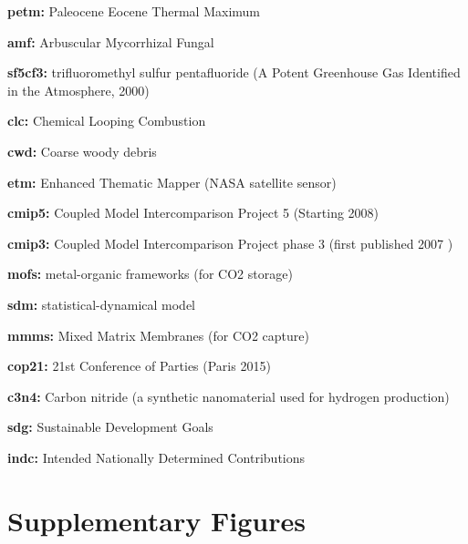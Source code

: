 \documentclass{article}
\begin{document}
\begin{linenumbers}
		\noindent\textbf{petm:} Paleocene Eocene Thermal Maximum
		
		\noindent\textbf{amf:}  Arbuscular Mycorrhizal Fungal
		
		\noindent\textbf{sf5cf3:} trifluoromethyl sulfur pentafluoride (A Potent Greenhouse Gas Identified in the Atmosphere, 2000)
		
		\noindent\textbf{clc:} Chemical Looping Combustion
		
		\noindent\textbf{cwd:} Coarse woody debris
		
		\noindent\textbf{etm:} Enhanced Thematic Mapper (NASA satellite sensor)
		
		\noindent\textbf{cmip5:} Coupled Model Intercomparison Project 5 (Starting 2008)
		
		\noindent\textbf{cmip3:} Coupled Model Intercomparison Project phase 3 (first published 2007 \cite{Meehl2007})
		
		\noindent\textbf{mofs:} metal-organic frameworks (for CO2 storage)
		
		\noindent\textbf{sdm:} statistical-dynamical model
		
		\noindent\textbf{mmms:} Mixed Matrix Membranes (for CO2 capture)
		
		\noindent\textbf{cop21:} 21st Conference of Parties (Paris 2015) 
		
		\noindent\textbf{c3n4:} Carbon nitride (a synthetic nanomaterial used for hydrogen production)
		
		\noindent\textbf{sdg:} Sustainable Development Goals
		
		\noindent\textbf{indc:} Intended Nationally Determined Contributions
		
		
	\end{linenumbers}
	
	\linespread{1}
	

	
	\section*{Supplementary Figures}
	
			\setcounter{figure}{0}
	\renewcommand\thefigure{SI.\arabic{figure}}  
	
\end{document}
